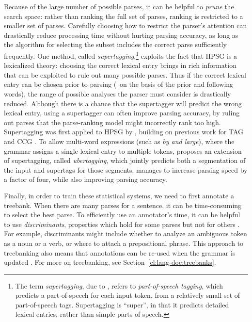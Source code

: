 \documentclass[output=paper,nonflat]{langsci/langscibook}
\begin{document}
Because of the large number of possible parses,
it can be helpful to \textit{prune} the search space:
rather than ranking the full set of parses,
ranking is restricted to a smaller set of parses.
Carefully choosing how to restrict the parser's attention 
can drastically reduce processing time without hurting parsing accuracy,
as long as the algorithm for selecting the subset
includes the correct parse sufficiently frequently.
One method, called \textit{supertagging},\footnote{%
	The term \textit{supertagging}, due to \citet{bangalore1999supertag},
	refers to \textit{part-of-speech tagging},
	which predicts a part-of-speech for each input token,
	from a relatively small set of part-of-speech tags.
	Supertagging is ``super'', in that it predicts detailed lexical entries,
	rather than simple parts of speech.
}
exploits the fact that HPSG is a lexicalized theory:
choosing the correct lexical entry brings in rich information
that can be exploited to rule out many possible parses.
Thus if the correct lexical entry can be chosen prior to parsing
(\eg\ on the basis of the prior and following words),
the range of possible analyses the parser must consider is drastically reduced.
Although there is a chance that the supertagger will predict the wrong lexical entry,
using a supertagger can often improve parsing accuracy,
by ruling out parses that the parse-ranking model might incorrectly rank too high.
Supertagging was first applied to HPSG by \citet{matsuzaki2007supertag},
building on previous work for TAG \citep{bangalore1999supertag}
and CCG \citep{clark2004supertag}.
To allow multi-word expressions (such as \textit{by and large}),
where the grammar assigns a single lexical entry to multiple tokens,
\citet{dridan2013ubertag} proposes an extension of supertagging, called \textit{ubertagging},
which jointly predicts both a segmentation of the input and supertags for those segments.
\citeauthor{dridan2013ubertag} manages to increase parsing speed by a factor of four,
while also improving parsing accuracy.


Finally, in order to train these statistical systems,
we need to first annotate a treebank.
When there are many parses for a sentence,
it can be time-consuming to select the best parse.
To efficiently use an annotator's time,
it can be helpful to use \textit{discriminants},
properties which hold for some parses but not for others \citep{Carter:97}.
For example, discriminants might include
whether to analyze an ambiguous token as a noun or a verb,
or where to attach a prepositional phrase.
This approach to treebanking also means that
annotations can be re-used when the grammar is updated
\citep{OFTM2004a-u,Fli:Oep:Ben:17}. For more on treebanking, see Section~\ref{cl:lang-doc:treebanks}.
\end{document}
